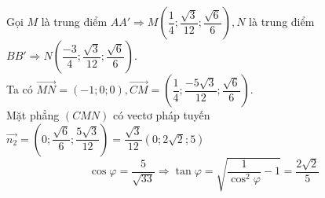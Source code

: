 \begin{ex}
{{\begin{tikzpicture}[scale=1, font=\footnotesize, line join=round, line cap=round, >=stealth]
		\end{tikzpicture}}\noindent
		Gọi $M$ là trung điểm $AA' \Rightarrow M\left(\dfrac{1}{4} ; \dfrac{\sqrt{3}}{12} ; \dfrac{\sqrt{6}}{6}\right), N$ là trung điểm $BB' \Rightarrow N\left(\dfrac{-3}{4} ; \dfrac{\sqrt{3}}{12} ; \dfrac{\sqrt{6}}{6}\right)$.\\
		Ta có $\overrightarrow{MN}=(-1 ; 0 ; 0), \overrightarrow{CM}=\left(\dfrac{1}{4} ; \dfrac{-5 \sqrt{3}}{12} ; \dfrac{\sqrt{6}}{6}\right)$.\\
		Mặt phẳng $(CMN)$ có vectơ pháp tuyến $\overrightarrow{n_2}=\left(0 ; \dfrac{\sqrt{6}}{6} ; \dfrac{5 \sqrt{3}}{12}\right)=\dfrac{\sqrt{3}}{12}(0 ; 2 \sqrt{2} ; 5)$
		\[\cos \varphi=\dfrac{5}{\sqrt{33}} \Rightarrow \tan \varphi=\sqrt{\frac{1}{\cos ^2 \varphi}-1}=\dfrac{2 \sqrt{2}}{5}\]
	}
\end{ex}
